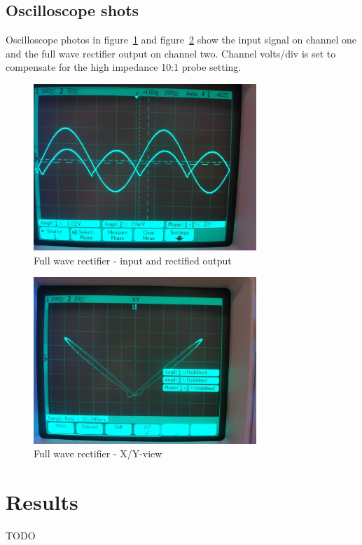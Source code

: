 \documentclass[11pt,a4paper]{article}
\begin{document}
\subsection{Oscilloscope shots}\label{fwr-oscilloscope-shots}
Oscilloscope photos in figure~\ref{fig:fwr1_scope} and
figure~\ref{fig:fwr2_scope} show the input signal on channel one and the full
wave rectifier output on channel two.  Channel volts/div is set to compensate
for the high impedance 10:1 probe setting. 

\begin{figure}[htbp]
    \centering
    \includegraphics[width=0.75\textwidth]{img/fwr1.jpg}
    \caption{Full wave rectifier - input and rectified output}
    \label{fig:fwr1_scope}
\end{figure}

\begin{figure}[htbp]
    \centering
    \includegraphics[width=0.75\textwidth]{img/fwr2.jpg}
    \caption{Full wave rectifier - X/Y-view}
    \label{fig:fwr2_scope}
\end{figure}

\section{Results}\label{setup}
TODO
\end{document}
